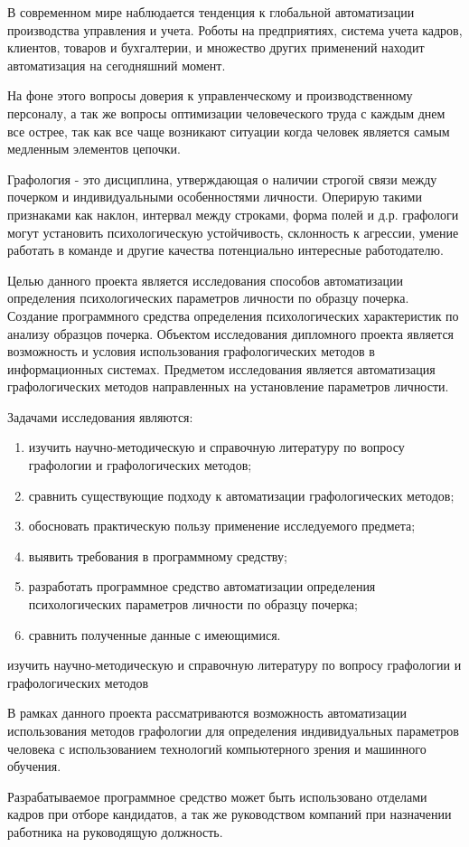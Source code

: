 \label{sec:intro}


В современном мире наблюдается тенденция к глобальной автоматизации производства управления и учета. Роботы на предприятиях, система учета кадров, клиентов, товаров и бухгалтерии, и множество других применений находит автоматизация на сегодняшний момент.

На фоне этого вопросы доверия к управленческому и производственному персоналу, а так же вопросы оптимизации человеческого труда с каждым днем все острее, так как все чаще возникают ситуации когда человек
является самым медленным элементов цепочки.

Графология - это дисциплина, утверждающая о наличии строгой связи между почерком и индивидуальными особенностями личности. Оперирую такими признаками как наклон, интервал между строками, форма полей и д.р. графологи могут установить психологическую устойчивость, склонность к агрессии, умение работать в команде и другие качества потенциально интересные работодателю.

Целью данного проекта является исследования способов автоматизации определения психологических параметров личности по образцу почерка. Создание программного средства определения психологических характеристик по анализу образцов почерка.  
Объектом исследования дипломного проекта является возможность и условия использования графологических методов в информационных системах.
Предметом исследования является автоматизация графологических методов направленных на установление параметров личности.

Задачами исследования являются:
\begin{enumerate}
  \item изучить научно-методическую и справочную литературу по вопросу графологии и графологических методов;
  \item сравнить существующие подходу к автоматизации графологических методов;
  \item обосновать практическую пользу применение исследуемого предмета;
  \item выявить требования в программному средству;
  \item разработать программное средство автоматизации определения психологических параметров личности по образцу почерка;
  \item сравнить полученные данные с имеющимися.
\end{enumerate}
изучить научно-методическую и справочную литературу по вопросу графологии и графологических методов

В рамках данного проекта рассматриваются возможность автоматизации использования методов графологии для определения индивидуальных параметров человека с использованием технологий компьютерного зрения и машинного обучения.

Разрабатываемое программное средство может быть использовано отделами кадров при отборе кандидатов, а так же руководством компаний при назначении работника на руководящую должность.